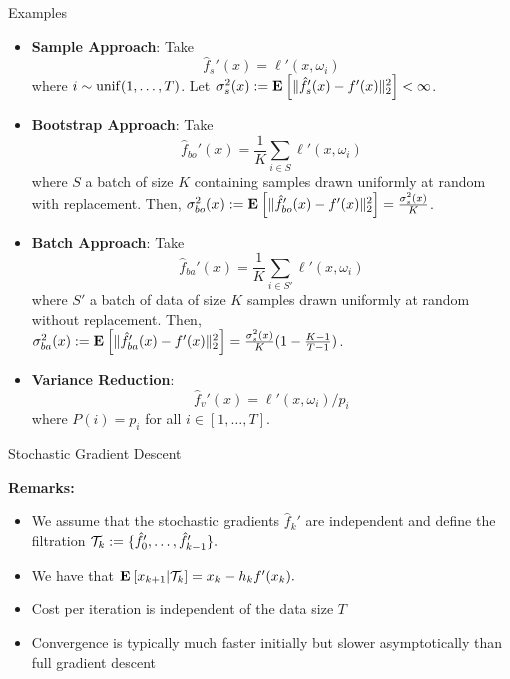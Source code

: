 \documentclass[9pt]{beamer}
\begin{document}
\begin{frame}{Examples}

  \begin{itemize}
    \setlength\itemsep{0.5em}
  \item \textbf{Sample Approach}: Take    
    \[
      \hat f_s'(x) = \ell'(x, \omega_i)
    \]
    where $i\sim {\rm{unif}}(1, \dots, T)$.
    Let $\sigma_s^2(x):= \mathbf{E}_{} \left[ \|\hat f_s '(x)-f'(x)\|_2^2 \right]<\infty$.

  \item<2-> \textbf{Bootstrap Approach}: Take
    \[
      \hat f_{bo} '(x) = \frac{1}{K} \sum_{i\in S}\ell'(x, \omega_i)
    \]
    where $S$ a batch of size $K$ containing samples drawn uniformly at random with replacement.
    Then, $\sigma_{bo}^2(x):= \mathbf{E}_{} \left[ \|\hat f_{bo} '(x)-f'(x)\|_2^2 \right] =\frac{\sigma_s^2(x)}{K} $.

  \item<3-> \textbf{Batch Approach}: Take
    \[
      \hat f_{ba} '(x) = \frac{1}{K}\sum_{i\in S'}\ell'(x, \omega_i)
    \]
    where $S'$ a batch of data of size $K$ samples drawn uniformly at random without replacement.
    Then, $\sigma_{ba}^2(x):= \mathbf{E}_{} \left[ \|\hat f_{ba} '(x)-f'(x)\|_2^2 \right] =\frac{\sigma_s^2(x)}{K} (1-\frac{K-1}{T-1})$.

  \item<4-> \textbf{Variance Reduction}:
    \[
      \hat f_v '(x) = \ell'(x, \omega_i)/p_i
    \]
    where $P(i)=p_i$ for all $i\in [1,\dots, T]$.
  \end{itemize}
  
\end{frame}

\begin{frame}{Stochastic Gradient Descent}

  \begin{algorithm}[H]
    \caption{Stochastic Gradient Descent}
  \end{algorithm}


  \vfill

  
  \textbf{Remarks:}
  \begin{itemize}
  \item We assume that the stochastic gradients $\hat f_k'$ are independent and define the filtration
    \(
    \mathcal T_k := \{\hat f'_0, \dots, \hat f'_{k-1}\}.
    \)
  \item We have that 
    \(
      \mathbf{E}_{} \left[ x_{k+1}|\mathcal T_k \right] = x_k-h_kf'(x_k).
    \)
  \item<2-> Cost per iteration is independent of the data size $T$
  \item<3-> Convergence is typically much faster initially but slower asymptotically than full gradient descent
  \end{itemize}
  
\end{frame}
\end{document}
